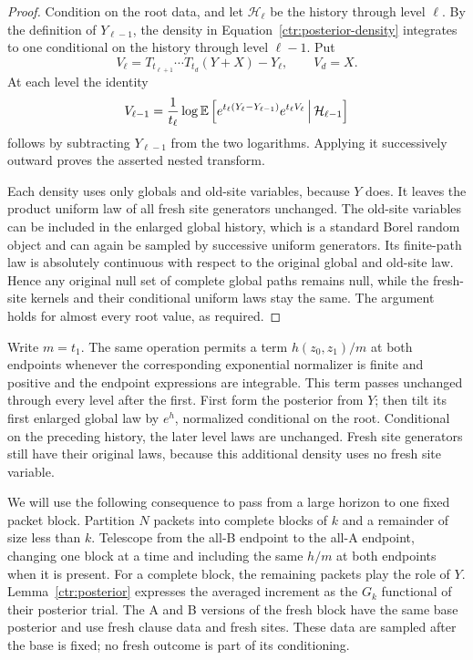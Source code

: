\begin{proof}
Condition on the root data, and let $\mathcal H_\ell$ be the history through
level $\ell$.  By the definition of $Y_{\ell-1}$, the density
in Equation~\eqref{ctr:posterior-density} integrates to one conditional on
the history through level $\ell-1$.  Put
\[
 V_\ell=T_{t_{\ell+1}}\cdots T_{t_d}(Y+X)-Y_\ell,
 \qquad V_d=X.
\]
At each level the identity
\[
 V_{\ell-1}=\frac1{t_\ell}\log\mathbb E\left[
   e^{t_\ell(Y_\ell-Y_{\ell-1})}e^{t_\ell V_\ell}
   \,\middle|\,\mathcal H_{\ell-1}\right]
\]
follows by subtracting $Y_{\ell-1}$ from the two logarithms.  Applying it
successively outward proves the asserted nested transform.

Each density uses only globals and old-site variables, because $Y$ does.
It leaves the product uniform law of all fresh site generators unchanged.
The old-site variables can be included in the enlarged global history,
which is a standard Borel random object and can again be sampled by
successive uniform generators.  Its finite-path law is absolutely continuous
with respect to the original global and old-site law.  Hence any original
null set of complete global paths remains null, while the fresh-site kernels
and their conditional uniform laws stay the same.  The argument holds for
almost every root value, as required.
\end{proof}

Write $m=t_1$.  The same operation permits a term $h(z_0,z_1)/m$ at both
endpoints whenever the corresponding exponential normalizer is finite and
positive and the endpoint expressions are integrable.  This term passes
unchanged through every level after the first.  First form the posterior
from $Y$; then tilt its first enlarged global law by $e^h$, normalized
conditional on the root.  Conditional on the preceding history, the later
level laws are unchanged.  Fresh site generators still have their original
laws, because this additional density uses no fresh site variable.

We will use the following consequence to pass from a large horizon to one
fixed packet block.  Partition $N$ packets into complete blocks of $k$ and
a remainder of size less than $k$.  Telescope from the all-B endpoint to
the all-A endpoint, changing one block at a time and including the same
$h/m$ at both endpoints when it is present.  For a complete block, the
remaining packets play the role of $Y$.  Lemma~\ref{ctr:posterior} expresses
the averaged increment as the $G_k$ functional of their posterior trial.
The A and B versions of the fresh block have the same base posterior and
use fresh clause data and fresh sites.  These data are sampled after the
base is fixed; no fresh outcome is part of its conditioning.

